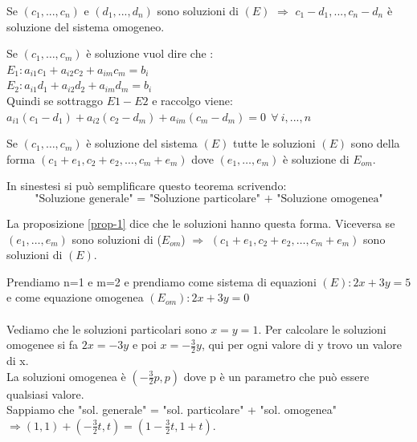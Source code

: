 \begin{proposition}\label{prop-1}
Se $(c_1, ..., c_n)$ e $(d_1, ..., d_n)$ sono soluzioni di $(E)$ $\Longrightarrow$ $c_1 - d_1, ..., c_n - d_n$ è soluzione del sistema omogeneo.
\end{proposition}

\begin{demostration}
Se $(c_1, \ldots, c_m)$ è soluzione vuol dire che :\\
$E_1:a_{i1}c_1 + a_{i2}c_2 + a_{im}c_m = b_i$\\
$E_2:a_{i1}d_1 + a_{i2}d_2 + a_{im}d_m = b_i$\\
Quindi se sottraggo $E1 - E2$ e raccolgo viene:\\
$a_{i1}(c_1 - d_1) + a_{i2}(c_2 - d_m) + a_{im}(c_m - d_m)= 0\:\: \forall \: i,...,n$
\end{demostration}

\begin{theorem}
Se $(c_1,\ldots,c_m)$ è soluzione del sistema $(E)$ tutte le soluzioni $(E)$ sono della forma $(c_1 + e_1, c_2 + e_2, \ldots, c_m + e_m)$ dove $(e_1,\ldots,e_m)$ è soluzione di $E_{om}$.
\end{theorem}
In sinestesi si può semplificare questo teorema scrivendo:
\begin{equation}
    \text{"Soluzione generale" = "Soluzione particolare" + "Soluzione omogenea"}
\end{equation}

\begin{demostration}
La proposizione \ref{prop-1} dice che le soluzioni hanno questa forma. Viceversa se $(e_1,\ldots,e_m)$ sono soluzioni di ($E_{om}$) $\Longrightarrow$ $(c_1 + e_1, c_2 + e_2, \ldots, c_m + e_m)$ sono soluzioni di $(E)$.
\end{demostration}

\begin{example}
Prendiamo n=1 e m=2 e prendiamo come sistema di equazioni $(E): 2x + 3y = 5$ e come equazione omogenea $(E_{om}): 2x + 3y = 0$\\\\
Vediamo che le soluzioni particolari sono $x = y = 1$. Per calcolare le soluzioni omogenee si fa $2x = -3y$ e poi $x = -\frac{3}{2}y$, qui per ogni valore di y trovo un valore di x. \\
La soluzioni omogenea è $(-\frac{3}{2}p, p)$ dove p è un parametro che può essere qualsiasi valore.\\
Sappiamo che "sol. generale" = "sol. particolare" + "sol. omogenea" $\Rightarrow (1,1) + (-\frac{3}{2}t,t) = (1 - \frac{3}{2}t, 1 + t)$.
\end{example}


